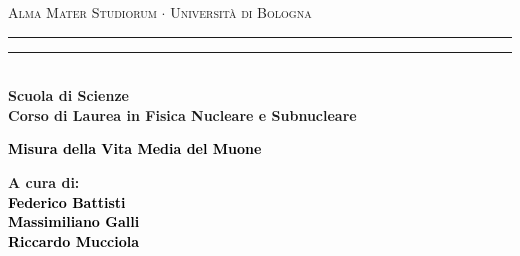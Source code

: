 \documentclass{standalone}
\begin{document}
\begin{titlepage}

\begin{center}
{{\Large{\textsc{Alma Mater Studiorum $\cdot$ Universit\`a di Bologna}}}}
\rule[0.1cm]{15.8cm}{0.1mm}
\rule[0.5cm]{15.8cm}{0.6mm}
\\\vspace{3mm}
{\small{\bf Scuola di Scienze \\ Corso di Laurea in Fisica Nucleare e Subnucleare}}
\end{center}

\vspace{23mm}

\begin{center}\textcolor{black}
{{\LARGE{\bf Misura della Vita Media del Muone}}\\}
\end{center}

\vspace{50mm} \par \noindent

\begin{minipage}[t]{0.47\textwidth}
  {\large{\bf A cura di: \vspace{2mm}\\\textcolor{black}{Federico Battisti}\\\textcolor{black}{Massimiliano Galli}\\\textcolor{black}{Riccardo Mucciola}\\}}
\end{minipage}

\hfill

\end{titlepage}


\tableofcontents
\end{document}
